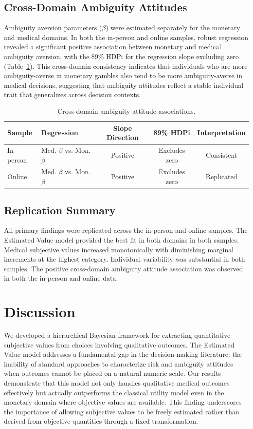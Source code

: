 \documentclass[12pt]{article}
\begin{document}
\subsection{Cross-Domain Ambiguity Attitudes}

Ambiguity aversion parameters ($\beta$) were estimated separately for the monetary and medical domains. In both the in-person and online samples, robust regression revealed a significant positive association between monetary and medical ambiguity aversion, with the 89\% HDPi for the regression slope excluding zero (Table~\ref{tab:ambiguity}). This cross-domain consistency indicates that individuals who are more ambiguity-averse in monetary gambles also tend to be more ambiguity-averse in medical decisions, suggesting that ambiguity attitudes reflect a stable individual trait that generalizes across decision contexts.

\begin{table}[ht]
\centering
\caption{Cross-domain ambiguity attitude associations.}
\label{tab:ambiguity}
\begin{tabular}{llccc}
\toprule
Sample & Regression & Slope Direction & 89\% HDPi & Interpretation \\
\midrule
In-person & Med. $\beta$ vs. Mon. $\beta$ & Positive & Excludes zero & Consistent \\
Online & Med. $\beta$ vs. Mon. $\beta$ & Positive & Excludes zero & Replicated \\
\bottomrule
\end{tabular}
\end{table}

\subsection{Replication Summary}

All primary findings were replicated across the in-person and online samples. The Estimated Value model provided the best fit in both domains in both samples. Medical subjective values increased monotonically with diminishing marginal increments at the highest category. Individual variability was substantial in both samples. The positive cross-domain ambiguity attitude association was observed in both the in-person and online data.

\section{Discussion}

We developed a hierarchical Bayesian framework for extracting quantitative subjective values from choices involving qualitative outcomes. The Estimated Value model addresses a fundamental gap in the decision-making literature: the inability of standard approaches to characterize risk and ambiguity attitudes when outcomes cannot be placed on a natural numeric scale. Our results demonstrate that this model not only handles qualitative medical outcomes effectively but actually outperforms the classical utility model even in the monetary domain where objective values are available. This finding underscores the importance of allowing subjective values to be freely estimated rather than derived from objective quantities through a fixed transformation.
\end{document}
